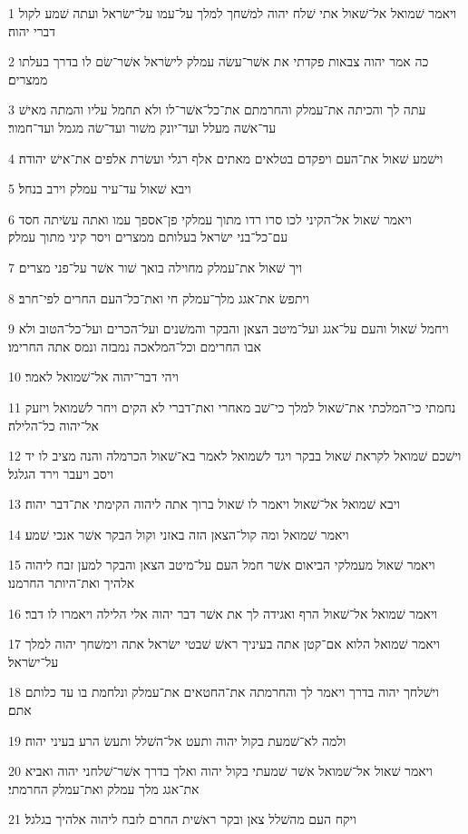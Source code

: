 \par 1 ויאמר שׁמואל אל־שׁאול אתי שׁלח יהוה למשׁחך למלך על־עמו על־ישׂראל ועתה שׁמע לקול דברי יהוה׃
\par 2 כה אמר יהוה צבאות פקדתי את אשׁר־עשׂה עמלק לישׂראל אשׁר־שׂם לו בדרך בעלתו ממצרים׃
\par 3 עתה לך והכיתה את־עמלק והחרמתם את־כל־אשׁר־לו ולא תחמל עליו והמתה מאישׁ עד־אשׁה מעלל ועד־יונק משׁור ועד־שׂה מגמל ועד־חמור׃
\par 4 וישׁמע שׁאול את־העם ויפקדם בטלאים מאתים אלף רגלי ועשׂרת אלפים את־אישׁ יהודה׃
\par 5 ויבא שׁאול עד־עיר עמלק וירב בנחל׃
\par 6 ויאמר שׁאול אל־הקיני לכו סרו רדו מתוך עמלקי פן־אספך עמו ואתה עשׂיתה חסד עם־כל־בני ישׂראל בעלותם ממצרים ויסר קיני מתוך עמלק׃
\par 7 ויך שׁאול את־עמלק מחוילה בואך שׁור אשׁר על־פני מצרים׃
\par 8 ויתפשׂ את־אגג מלך־עמלק חי ואת־כל־העם החרים לפי־חרב׃
\par 9 ויחמל שׁאול והעם על־אגג ועל־מיטב הצאן והבקר והמשׁנים ועל־הכרים ועל־כל־הטוב ולא אבו החרימם וכל־המלאכה נמבזה ונמס אתה החרימו׃
\par 10 ויהי דבר־יהוה אל־שׁמואל לאמר׃
\par 11 נחמתי כי־המלכתי את־שׁאול למלך כי־שׁב מאחרי ואת־דברי לא הקים ויחר לשׁמואל ויזעק אל־יהוה כל־הלילה׃
\par 12 וישׁכם שׁמואל לקראת שׁאול בבקר ויגד לשׁמואל לאמר בא־שׁאול הכרמלה והנה מציב לו יד ויסב ויעבר וירד הגלגל׃
\par 13 ויבא שׁמואל אל־שׁאול ויאמר לו שׁאול ברוך אתה ליהוה הקימתי את־דבר יהוה׃
\par 14 ויאמר שׁמואל ומה קול־הצאן הזה באזני וקול הבקר אשׁר אנכי שׁמע׃
\par 15 ויאמר שׁאול מעמלקי הביאום אשׁר חמל העם על־מיטב הצאן והבקר למען זבח ליהוה אלהיך ואת־היותר החרמנו׃
\par 16 ויאמר שׁמואל אל־שׁאול הרף ואגידה לך את אשׁר דבר יהוה אלי הלילה ויאמרו לו דבר׃
\par 17 ויאמר שׁמואל הלוא אם־קטן אתה בעיניך ראשׁ שׁבטי ישׂראל אתה וימשׁחך יהוה למלך על־ישׂראל׃
\par 18 וישׁלחך יהוה בדרך ויאמר לך והחרמתה את־החטאים את־עמלק ונלחמת בו עד כלותם אתם׃
\par 19 ולמה לא־שׁמעת בקול יהוה ותעט אל־השׁלל ותעשׂ הרע בעיני יהוה׃
\par 20 ויאמר שׁאול אל־שׁמואל אשׁר שׁמעתי בקול יהוה ואלך בדרך אשׁר־שׁלחני יהוה ואביא את־אגג מלך עמלק ואת־עמלק החרמתי׃
\par 21 ויקח העם מהשׁלל צאן ובקר ראשׁית החרם לזבח ליהוה אלהיך בגלגל׃
